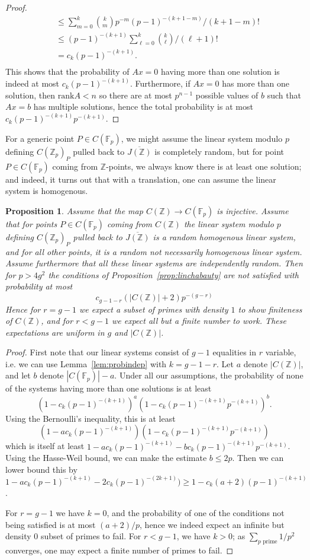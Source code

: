 \documentclass[12pt]{article}
\newcommand{\Z}{\mathbb{Z}}
\newcommand{\F}{\mathbb{F}}
\theoremstyle{plain}
\newtheorem{prop}[thm]{Proposition} %
\theoremstyle{definition}
\theoremstyle{remark}
\begin{document}
\begin{proof}
\begin{align*}
&\leq \sum_{m = 0}^{k} \binom{k}{m}p^{-m}(p-1)^{-(k+1-m)}/(k+1-m)! \\
&\leq (p-1)^{-(k+1)} \sum_{\ell = 0}^k \binom{k}{\ell}/(\ell+1)! \\
& = c_k (p-1)^{-(k+1)}.\\
\end{align*}
This shows that the probability of $Ax = 0$ having more than one solution is indeed at most $c_k (p-1)^{-(k+1)}$. Furthermore, if $Ax = 0$ has more than one solution, then $\text{rank} A < n$ so there are at most $p^{n-1}$ possible values of $b$ such that $Ax = b$ has multiple solutions, hence the total probability is at most $c_k (p-1)^{-(k+1)} p^{-(k+1)}$.
\end{proof}

For a generic point $P \in C(\F_p)$, we might assume the linear system modulo $p$ defining $C(\Z_p)_P$ pulled back to $\overline{J(\Z)}$ is completely random, but for point $P \in C(\F_p)$ coming from $\Z$-points, we always know there is at least one solution; and indeed, it turns out that with a translation, one can assume the linear system is homogenous.
\begin{prop}
\label{prop:probwork}
Assume that the map $C(\Z) \to C(\F_p)$ is injective. Assume that for points $P \in C(\F_p)$ coming from $C(\Z)$ the linear system modulo $p$ defining $C(\Z_p)_P$ pulled back to $\overline{J(\Z)}$ is a random homogenous linear system, and for all other points, it is a random not necessarily homogenous linear system. Assume furthermore that all these linear systems are independently random. Then for $p > 4g^2$ the conditions of Proposition~\ref{prop:linchabauty} are not satisfied with probability at most
\[
c_{g-1-r}(|C(\Z)|+2)p^{-(g-r)}
\]
Hence for $r = g-1$ we expect a subset of primes with density $1$ to show finiteness of $C(\Z)$, and for $r < g-1$ we expect all but a finite number to work. These expectations are uniform in $g$ and $|C(\Z)|$.
\end{prop}
\begin{proof}
First note that our linear systems consist of $g-1$ equalities in $r$ variable, i.e. we can use Lemma~\ref{lem:probindep} with $k = g-1-r$. Let $a$ denote $|C(\Z)|$, and let $b$ denote $|C(\F_p)|-a$. Under all our assumptions, the probability of none of the systems having more than one solutions is at least
\[
\left(1 - c_k(p-1)^{-(k+1)}\right)^{a} \left(1 - c_k(p-1)^{-(k+1)}p^{-(k+1)}\right)^b.
\]
Using the Bernoulli's inequality, this is at least 
\[
\left(1- ac_k(p-1)^{-(k+1)}\right)\left(1 - c_k(p-1)^{-(k+1)}p^{-(k+1)}\right)
\]
which is itself at least $1 - ac_k(p-1)^{-(k+1)} - bc_k(p-1)^{-(k+1)}p^{-(k+1)}$. Using the Hasse-Weil bound, we can make the estimate $b \leq 2p$. Then we can lower bound this by $1 - ac_k(p-1)^{-(k+1)} - 2c_k(p-1)^{-(2k+1)}) \geq 1 - c_k(a+2)(p-1)^{-(k+1)}$.

For $r = g-1$ we have $k= 0$, and the probability of one of the conditions not being satisfied is at most $(a+2)/p$, hence we indeed expect an infinite but density $0$ subset of primes to fail. For $r < g-1$, we have $k > 0$; as $\sum_{p\text{ prime}} 1/p^2$ converges, one may expect a finite number of primes to fail.
\end{proof}
\end{document}
